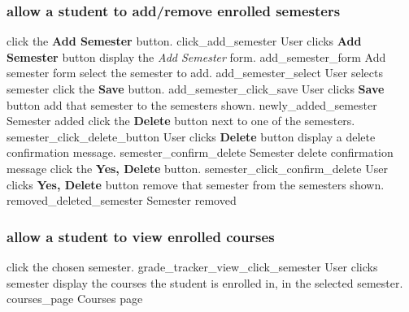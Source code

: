 \documentclass[12pt]{article}
\newenvironment{requirement}[1]
{
    \renewcommand{\thesubsubsection}{R\arabic{subsubsection}.}
    \renewcommand{\labelenumi}{
        \arabic{subsubsection}.\arabic{enumi}
    }
    \renewcommand{\labelenumii}{
        \arabic{subsubsection}.\arabic{enumi}.\arabic{enumii}
    }
    \renewcommand{\labelenumiii}{
        \arabic{subsubsection}.\arabic{enumi}.\arabic{enumii}.\arabic{enumiii}
    }
    \renewcommand{\labelenumiv}{
        \arabic{subsubsection}.\arabic{enumi}.\arabic{enumii}.\arabic{enumiii}.\arabic{enumiv}
    }
    \subsubsection{#1}
    \begin{enumerate}
}
{
    \end{enumerate}
}
\begin{document}
\begin{requirement}{\sysshall allow a student to add/remove enrolled semesters}
    \navsemesters
    \screenshotstep
      {\stushall click the \textbf{Add Semester} button.}
      {click_add_semester}
      {User clicks \textbf{Add Semester} button}
    \screenshotstep
      {\sysshall display the \emph{Add Semester} form.}
      {add_semester_form}
      {Add semester form}
    \screenshotstep
      {\stushall select the semester to add.}
      {add_semester_select}
      {User selects semester}
    \screenshotstep
      {\stushall click the \textbf{Save} button.}
      {add_semester_click_save}
      {User clicks \textbf{Save} button}
    \screenshotstep
      {\sysshall add that semester to the semesters shown.}
      {newly_added_semester}
      {Semester added}
    \screenshotstep
      {\stushall click the \textbf{Delete} button next to one of the semesters.}
      {semester_click_delete_button}
      {User clicks \textbf{Delete} button}
    \screenshotstep
      {\sysshall display a delete confirmation message.}
      {semester_confirm_delete}
      {Semester delete confirmation message}
    \screenshotstep
      {\stushall click the \textbf{Yes, Delete} button.}
      {semester_click_confirm_delete}
      {User clicks \textbf{Yes, Delete} button}
    \screenshotstep
      {\sysshall remove that semester from the semesters shown.}
      {removed_deleted_semester}
      {Semester removed}
    \gotohome
\end{requirement}

\newcommand{\navcourses}{
    \navsemesters
    \screenshotstep
      {\stushall click the chosen semester.}
      {grade_tracker_view_click_semester}
      {User clicks semester}
    \screenshotstep
      {\sysshall display the courses the student is enrolled in, in the selected semester.}
      {courses_page}
      {Courses page}
}

\begin{requirement}{\sysshall allow a student to view enrolled courses}
    \navcourses
\end{requirement}
\end{document}

